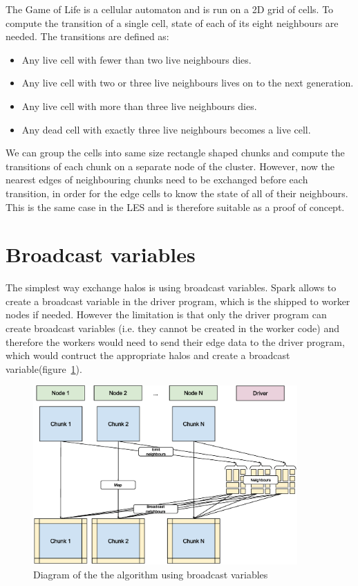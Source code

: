 \documentclass{l4proj}
\begin{document}
The Game of Life is a cellular automaton and is run on a 2D grid of cells. To compute
the transition of a single cell, state of each of its eight neighbours are needed.
The transitions are defined as:

\begin{itemize} 
\item Any live cell with fewer than two live neighbours dies.
\item Any live cell with two or three live neighbours lives on to the next generation.
\item Any live cell with more than three live neighbours dies.
\item Any dead cell with exactly three live neighbours becomes a live cell.
\end{itemize}

We can group the cells into same size rectangle shaped chunks and compute the transitions of each
chunk on a separate node of the cluster. However, now the nearest edges of neighbouring
chunks need to be exchanged before each transition, in order for the edge cells to know
the state of all of their neighbours. This is the same case in the LES and is therefore
suitable as a proof of concept.

\section{Broadcast variables}
\label{chap:broadcast}

The simplest way exchange halos is using broadcast variables. Spark allows to
create a broadcast variable in the driver program, which is the shipped to worker
nodes if needed. However the limitation is that only the driver program can create
broadcast variables (i.e. they cannot be created in the worker code) and therefore
the workers would need to send their edge data to the driver program, which would
contruct the appropriate halos and create a broadcast variable(figure~\ref{fig:broadcast}).

\begin{figure}
\centering
\includegraphics[width=0.9\textwidth]{images/Broadcast_variable.eps}
\caption{Diagram of the the algorithm using broadcast variables}
\label{fig:broadcast}
\end{figure}
\end{document}
